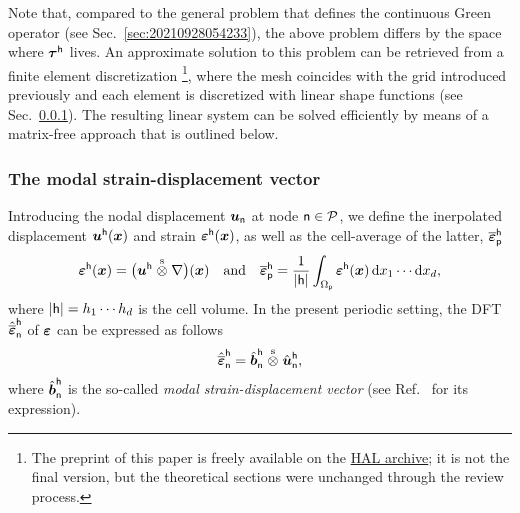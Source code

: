 Note that, compared to the general problem that defines the continuous Green
operator (see Sec.~\ref{sec:20210928054233}), the above problem differs by the
space where \(\boldsymbol\tau^\mathsf{h}\) lives. An approximate solution to this
problem can be retrieved from a finite element discretization
\parencite{bris2017}\footnote{The preprint of this paper is freely available on
  the \href{https://hal-enpc.archives-ouvertes.fr/hal-01304603}{HAL archive}; it
  is not the final version, but the theoretical sections were unchanged through
  the review process.}, where the mesh coincides with the grid introduced
previously and each element is discretized with linear shape functions (see
Sec.~\ref{}). The resulting linear system can be solved efficiently by means of
a matrix-free approach that is outlined below.

\subsubsection{The modal strain-displacement vector}

Introducing the nodal displacement \(\boldsymbol u_\mathsf{n}\) at node
\(\mathsf{n}\in\mathcal{P}\), we define the inerpolated displacement
\(\boldsymbol u^\mathsf{h}(\boldsymbol x)\) and strain \(\boldsymbol{\boldsymbol{\varepsilon}}^\mathsf{h}(\boldsymbol x)\), as
well as the cell-average of the latter,
\(\overline{\boldsymbol{\boldsymbol{\varepsilon}}}_\mathsf{p}^\mathsf{h}\)
\begin{equation}
  \boldsymbol\varepsilon^\mathsf{h}(\boldsymbol x)=\bigl(\boldsymbol
  u^\mathsf{h}\stackrel{\mathrm{s}}{\otimes}\nabla\bigr)(\boldsymbol x)
  \quad\text{and}\quad
  \overline{\boldsymbol\varepsilon}_\mathsf{p}^\mathsf{h}
  =\frac1{\lvert\mathsf{h}\rvert}\int_{\Omega_\mathsf{p}}\boldsymbol{\boldsymbol{\varepsilon}}^\mathsf{h}(\boldsymbol x)
  \,\mathrm d x_1\cdots\mathrm d x_d,
\end{equation}
where \(|\mathsf{h}|=h_1\cdots h_d\) is the cell volume. In the present periodic
setting, the DFT \(\hat{\overline{\boldsymbol\varepsilon}}_\mathsf{n}^\mathsf{h}\) of
\(\boldsymbol\varepsilon\) can be expressed as follows
\begin{equation}
  \label{eq:20210914144114}
  \hat{\overline{\boldsymbol\varepsilon}}_\mathsf{n}^\mathsf{h}
  =\hat{\boldsymbol b}_\mathsf{n}^\mathsf{h}\stackrel{\mathrm{s}}{\otimes}\hat{\boldsymbol u}_\mathsf{n}^\mathsf{h},
\end{equation}
where \(\hat{\boldsymbol b}_\mathsf{n}^\mathsf{h}\) is the so-called \emph{modal
  strain-displacement vector} (see Ref.~\cite{bris2017} for its expression).

